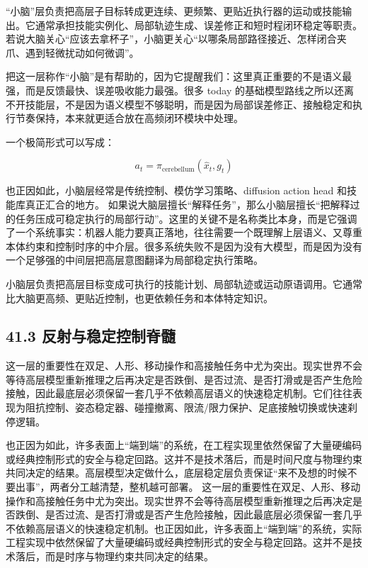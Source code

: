 “小脑”层负责把高层子目标转成更连续、更频繁、更贴近执行器的运动或技能输出。它通常承担技能实例化、局部轨迹生成、误差修正和短时程闭环稳定等职责。若说大脑关心“应该去拿杯子”，小脑更关心“以哪条局部路径接近、怎样闭合夹爪、遇到轻微扰动如何微调”。

把这一层称作“小脑”是有帮助的，因为它提醒我们：这里真正重要的不是语义最强，而是反馈最快、误差吸收能力最强。很多 today 的基础模型路线之所以还离不开技能层，不是因为语义模型不够聪明，而是因为局部误差修正、接触稳定和执行节奏保持，本来就更适合放在高频闭环模块中处理。

一个极简形式可以写成：

\begin{equation*}
a_t = \pi_{\text{cerebellum}}(\hat{x}_t, g_t)
\end{equation*}

也正因如此，小脑层经常是传统控制、模仿学习策略、diffusion action head 和技能库真正汇合的地方。 如果说大脑层擅长“解释任务”，那么小脑层擅长“把解释过的任务压成可稳定执行的局部行动”。这里的关键不是名称类比本身，而是它强调了一个系统事实：机器人能力要真正落地，往往需要一个既理解上层语义、又尊重本体约束和控制时序的中介层。很多系统失败不是因为没有大模型，而是因为没有一个足够强的中间层把高层意图翻译为局部稳定执行策略。

小脑层负责把高层目标变成可执行的技能计划、局部轨迹或运动原语调用。它通常比大脑更高频、更贴近控制，也更依赖任务和本体特定知识。

\subsection*{41.3 反射与稳定控制脊髓}


这一层的重要性在双足、人形、移动操作和高接触任务中尤为突出。现实世界不会等待高层模型重新推理之后再决定是否跌倒、是否过流、是否打滑或是否产生危险接触，因此最底层必须保留一套几乎不依赖高层语义的快速稳定机制。它们往往表现为阻抗控制、姿态稳定器、碰撞撤离、限流/限力保护、足底接触切换或快速刹停逻辑。

也正因为如此，许多表面上“端到端”的系统，在工程实现里依然保留了大量硬编码或经典控制形式的安全与稳定回路。这并不是技术落后，而是时间尺度与物理约束共同决定的结果。高层模型决定做什么，底层稳定层负责保证“来不及想的时候不要出事”，两者分工越清楚，整机越可部署。 这一层的重要性在双足、人形、移动操作和高接触任务中尤为突出。现实世界不会等待高层模型重新推理之后再决定是否跌倒、是否过流、是否打滑或是否产生危险接触，因此最底层必须保留一套几乎不依赖高层语义的快速稳定机制。也正因如此，许多表面上“端到端”的系统，实际工程实现中依然保留了大量硬编码或经典控制形式的安全与稳定回路。这并不是技术落后，而是时序与物理约束共同决定的结果。

